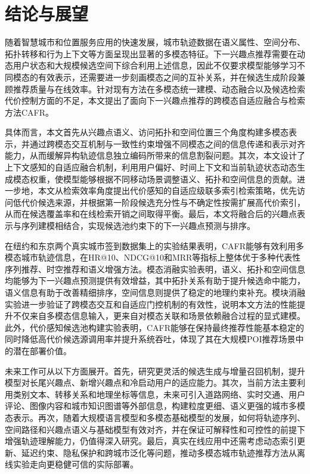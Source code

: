 \documentclass{rjthesis}
\begin{document}
\section{结论与展望}

随着智慧城市和位置服务应用的快速发展，城市轨迹数据在语义属性、空间分布、拓扑转移和行为上下文等方面呈现出显著的多模态特征。下一兴趣点推荐需要在动态用户状态和大规模候选空间下综合利用上述信息，因此不仅要求模型能够学习不同模态的有效表示，还需要进一步刻画模态之间的互补关系，并在候选生成阶段兼顾推荐质量与在线效率。针对现有方法在多模态统一建模、动态融合以及候选检索代价控制方面的不足，本文提出了面向下一兴趣点推荐的跨模态自适应融合与检索方法CAFR。

具体而言，本文首先从兴趣点语义、访问拓扑和空间位置三个角度构建多模态表示，并通过跨模态交互机制与一致性约束增强不同模态之间的信息传递和表示对齐能力，从而缓解异构轨迹信息独立编码所带来的信息割裂问题。其次，本文设计了上下文感知的自适应融合机制，利用用户偏好、时间上下文和当前轨迹状态动态生成模态权重，使模型能够根据不同移动场景调整语义、拓扑和空间信息的贡献。进一步地，本文从检索效率角度提出代价感知的自适应级联多索引检索策略，优先访问低代价候选来源，并根据第一阶段候选充分性与不确定性按需扩展高代价索引，从而在候选覆盖率和在线检索开销之间取得平衡。最后，本文将融合后的兴趣点表示与序列建模相结合，实现候选池约束下的下一兴趣点预测与排序。

在纽约和东京两个真实城市签到数据集上的实验结果表明，CAFR能够有效利用多模态城市轨迹信息，在HR@10、NDCG@10和MRR等指标上整体优于多种代表性序列推荐、时空推荐和语义增强方法。模态消融实验表明，语义、拓扑和空间信息均能够为下一兴趣点预测提供有效增益，其中拓扑关系有助于提升候选命中能力，语义信息有助于改善精细排序，空间信息则提供了稳定的地理约束补充。模块消融实验进一步验证了跨模态交互和自适应门控机制的有效性，说明本文方法的性能提升不仅来自多模态信息输入，更来自对模态关联和场景依赖融合过程的显式建模。此外，代价感知候选池构建实验表明，CAFR能够在保持最终推荐性能基本稳定的同时降低高代价候选源调用率并提升系统吞吐，体现了其在大规模POI推荐场景中的潜在部署价值。

未来工作可从以下方面展开。首先，研究更灵活的候选生成与增量召回机制，提升模型对长尾兴趣点、新增兴趣点和冷启动用户的适应能力。其次，当前方法主要利用类别文本、转移关系和地理坐标等信息，未来可引入道路网络、实时交通、用户评论、图像内容和城市知识图谱等外部信息，构建粒度更细、语义更强的城市多模态表示。再次，随着大规模语言模型和多模态基础模型的发展，如何将轨迹序列、空间路径和兴趣点语义与基础模型有效对齐，并在保证可解释性和可控性的前提下增强轨迹理解能力，仍值得深入研究。最后，真实在线应用中还需考虑动态索引更新、延迟约束、隐私保护和跨城市泛化等问题，推动多模态城市轨迹推荐方法从离线实验走向更稳健可信的实际部署。
\end{document}
